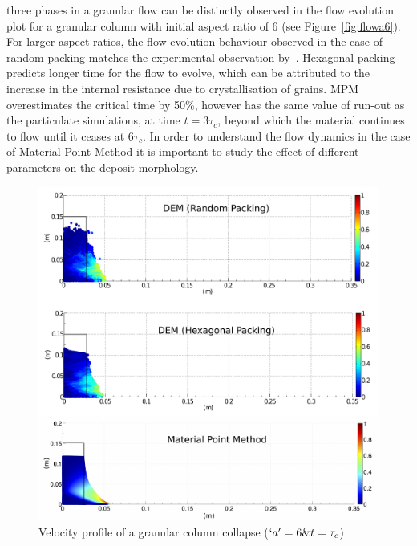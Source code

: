 three phases in a granular flow can be distinctly observed in the flow 
evolution plot for a granular column with initial aspect ratio of 6 (see 
Figure~\cref{fig:flowa6}). For larger aspect ratios, the flow evolution 
behaviour 
observed in the case of random packing matches the experimental observation 
by~\citet{Lajeunesse2004}. Hexagonal packing predicts longer time for the flow 
to evolve, which can be attributed to the increase in the internal resistance 
due to crystallisation of grains. MPM overestimates the critical time by 50\%, 
however has the same value of run-out as the particulate simulations, at time 
$\textit{t}=3\tau_{c}$, beyond which the material continues to flow until it 
ceases at 6$\tau_{c}$. In order to understand the flow dynamics in the case of 
Material Point Method it is important to study the effect of different 
parameters on the deposit morphology. 

\begin{figure}[tbhp]
\centering
\includegraphics[width=\textwidth]{a6tc}
\caption{Velocity profile of a granular column collapse ($`a' = 6 \& 
t=\tau_c$)}
\label{fig:a6tc}
\end{figure}

